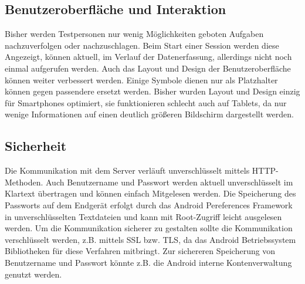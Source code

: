 \subsection{Benutzeroberfläche und Interaktion}
Bisher werden Testpersonen nur wenig Möglichkeiten geboten Aufgaben nachzuverfolgen oder nachzuschlagen.
Beim Start einer Session werden diese Angezeigt, können aktuell, im Verlauf der Datenerfassung, allerdings nicht noch einmal aufgerufen werden.
Auch das Layout und Design der Benutzeroberfläche können weiter verbessert werden.
Einige Symbole dienen nur als Platzhalter können gegen passendere ersetzt werden.
Bisher wurden Layout und Design einzig für Smartphones optimiert, sie funktionieren schlecht auch auf Tablets, da nur wenige Informationen auf einen deutlich größeren Bildschirm dargestellt werden.

\subsection{Sicherheit}
Die Kommunikation mit dem Server verläuft unverschlüsselt mittels \ac{HTTP}-Methoden.
Auch Benutzername und Passwort werden aktuell unverschlüsselt im Klartext übertragen und können einfach Mitgelesen werden.
Die Speicherung des Passworts auf dem Endgerät erfolgt durch das Android Pereferences Framework in unverschlüsselten Textdateien und kann mit Root-Zugriff leicht ausgelesen werden.  
Um die Kommunikation sicherer zu gestalten sollte die Kommunikation verschlüsselt werden, z.B. mittels \ac{SSL} bzw. \ac{TLS}, da das Android Betriebssystem Bibliotheken für diese Verfahren mitbringt.
Zur sichereren Speicherung von Benutzername und Passwort könnte z.B. die Android interne Kontenverwaltung genutzt werden.